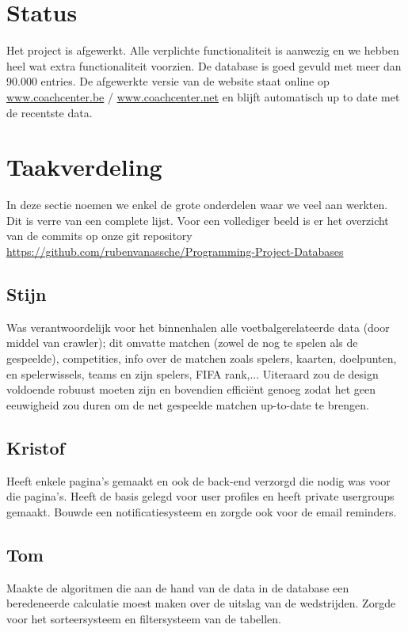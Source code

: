 \documentclass[11pt, a4paper]{article}
\begin{document}
\title{}
\author{Groep A\\ Eindrapport}
\date{27 mei 2014}
\maketitle

\section{Status}
Het project is afgewerkt. Alle verplichte functionaliteit is aanwezig en we hebben heel wat extra functionaliteit voorzien. De database is goed gevuld met meer dan 90.000 entries. De afgewerkte versie van de website staat online op \url{www.coachcenter.be} / \url{www.coachcenter.net} en blijft automatisch up to date met de recentste data.
\section{Taakverdeling}
In deze sectie noemen we enkel de grote onderdelen waar we veel aan werkten. Dit is verre van een complete lijst. Voor een vollediger beeld is er het overzicht van de commits op onze git repository \\ \url{https://github.com/rubenvanassche/Programming-Project-Databases}
\subsection{Stijn}
Was verantwoordelijk voor het binnenhalen alle voetbalgerelateerde data (door middel van crawler); dit omvatte matchen (zowel de nog te spelen als de gespeelde), competities, info over de matchen zoals spelers, kaarten, doelpunten, en spelerwissels, teams en zijn spelers, FIFA rank,... Uiteraard zou de design voldoende robuust moeten zijn en bovendien effici\"ent genoeg zodat het geen eeuwigheid zou duren om de net gespeelde matchen up-to-date te brengen.
\subsection{Kristof}
Heeft enkele pagina's gemaakt en ook de back-end verzorgd die nodig was voor die pagina's. Heeft de basis gelegd voor user profiles en  heeft private usergroups gemaakt. Bouwde een notificatiesysteem en zorgde ook voor de email reminders. 
\subsection{Tom}
Maakte de algoritmen die aan de hand van de data in de database een beredeneerde calculatie moest maken over de uitslag van de wedstrijden.
Zorgde voor het sorteersysteem en filtersysteem van de tabellen.
\end{document}
